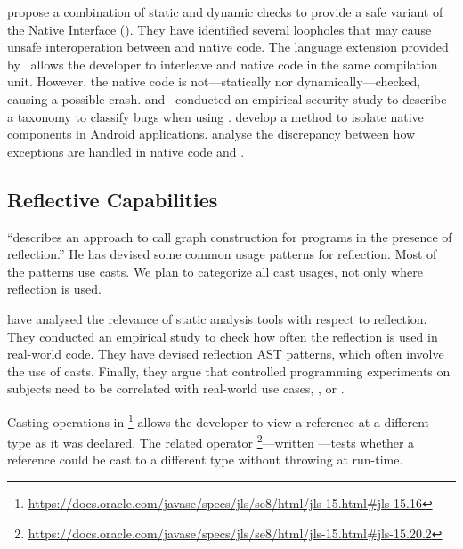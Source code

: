 \cite{tanSafeJavaNative2006} propose a combination of static and dynamic checks to provide a safe variant of the \java{} Native Interface (\jni{}).
They have identified several loopholes that may cause unsafe interoperation between \java{} and native code.
The language extension provided by~\cite{Bubak00creatingjava}
allows the developer to interleave \java{} and native code in the same compilation unit.
However, the native code is not---statically nor dynamically---checked,
causing a possible \jvm{} crash.
\cite{tanEmpiricalSecurityStudy2008} and~\cite{kondohFindingBugsJava2008}
conducted an empirical security study to describe a taxonomy to classify bugs when using \jni{}.
\cite{sunNativeGuardProtectingAndroid2014} develop a method to isolate native components in Android applications.
\cite{liFindingBugsExceptional2009} analyse the discrepancy between how exceptions are handled in native code and \java{}.

\subsection{Reflective Capabilities}
\label{sec:literature-review:casting}

\cite{livshitsImprovingSoftwareSecurity2006,livshitsReflectionAnalysisJava2005} ``describes an approach to call graph construction for \java{} programs in the presence of reflection.''
He has devised some common usage patterns for reflection.
Most of the patterns use casts.
We plan to categorize all cast usages,
not only where reflection is used.

\cite{landmanChallengesStaticAnalysis2017} have analysed the relevance of
static analysis tools with respect to reflection.
They conducted an empirical study to check how often the reflection
\api{} is used in real-world code.
They have devised reflection AST patterns,
which often involve the use of casts.
Finally, they argue that controlled programming experiments on
subjects need to be correlated with real-world use cases,
\eg, \github{} or \mavencentral{}.

Casting operations in \java{}%
\footnote{\url{https://docs.oracle.com/javase/specs/jls/se8/html/jls-15.html\#jls-15.16}}
allows the developer to view a reference at a different type as it was declared.
The related  operator%
\footnote{\url{https://docs.oracle.com/javase/specs/jls/se8/html/jls-15.html\#jls-15.20.2}}---written ---tests whether a reference  could be cast to a different type  without
throwing  at run-time.

